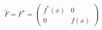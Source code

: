 \begin{equation}\label{INVO}
{\tilde F} = F^* =  \left(
      \begin{array}{cc}
       f^*(x) & 0 \\
       0 & f(x)
\end{array}
\right)
\end{equation}

